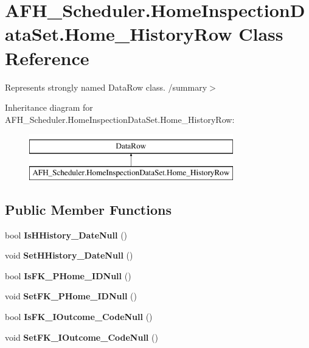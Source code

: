 \section{A\+F\+H\+\_\+\+Scheduler.\+Home\+Inspection\+Data\+Set.\+Home\+\_\+\+History\+Row Class Reference}
\label{class_a_f_h___scheduler_1_1_home_inspection_data_set_1_1_home___history_row}


Represents strongly named Data\+Row class. /summary$>$  


Inheritance diagram for A\+F\+H\+\_\+\+Scheduler.\+Home\+Inspection\+Data\+Set.\+Home\+\_\+\+History\+Row\+:\begin{figure}[H]
\begin{center}
\leavevmode
\includegraphics[height=2.000000cm]{class_a_f_h___scheduler_1_1_home_inspection_data_set_1_1_home___history_row}
\end{center}
\end{figure}
\subsection*{Public Member Functions}
\begin{DoxyCompactItemize}
\item 
\mbox{\label{class_a_f_h___scheduler_1_1_home_inspection_data_set_1_1_home___history_row_a8389cf3b649a593b237f7c693eedc165}} 
bool {\bfseries Is\+H\+History\+\_\+\+Date\+Null} ()
\item 
\mbox{\label{class_a_f_h___scheduler_1_1_home_inspection_data_set_1_1_home___history_row_a9ca7876f626a691d36dc2a77b8b83047}} 
void {\bfseries Set\+H\+History\+\_\+\+Date\+Null} ()
\item 
\mbox{\label{class_a_f_h___scheduler_1_1_home_inspection_data_set_1_1_home___history_row_ad10b961564d7b3183680f3942ba42bc3}} 
bool {\bfseries Is\+F\+K\+\_\+\+P\+Home\+\_\+\+I\+D\+Null} ()
\item 
\mbox{\label{class_a_f_h___scheduler_1_1_home_inspection_data_set_1_1_home___history_row_a0cacda4d325ab8d669f5e0e6ad6349ec}} 
void {\bfseries Set\+F\+K\+\_\+\+P\+Home\+\_\+\+I\+D\+Null} ()
\item 
\mbox{\label{class_a_f_h___scheduler_1_1_home_inspection_data_set_1_1_home___history_row_ace6c99b344cbde12f66335d754a16db1}} 
bool {\bfseries Is\+F\+K\+\_\+\+I\+Outcome\+\_\+\+Code\+Null} ()
\item 
\mbox{\label{class_a_f_h___scheduler_1_1_home_inspection_data_set_1_1_home___history_row_a62ce409d4d1f6d11239f19f7389e9f41}} 
void {\bfseries Set\+F\+K\+\_\+\+I\+Outcome\+\_\+\+Code\+Null} ()
\end{DoxyCompactItemize}
